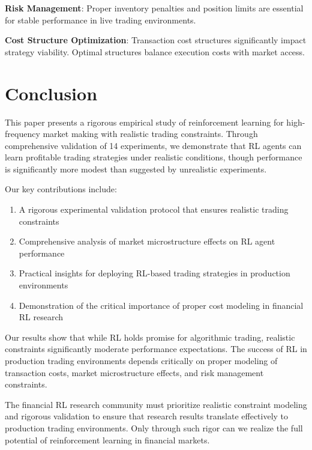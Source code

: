 \documentclass[11pt,a4paper]{article}
\begin{document}
\textbf{Risk Management}: Proper inventory penalties and position limits are essential for stable performance in live trading environments.

\textbf{Cost Structure Optimization}: Transaction cost structures significantly impact strategy viability. Optimal structures balance execution costs with market access.

\section{Conclusion}
\label{sec:conclusion}

This paper presents a rigorous empirical study of reinforcement learning for high-frequency market making with realistic trading constraints. Through comprehensive validation of 14 experiments, we demonstrate that RL agents can learn profitable trading strategies under realistic conditions, though performance is significantly more modest than suggested by unrealistic experiments.

Our key contributions include:

\begin{enumerate}
\item A rigorous experimental validation protocol that ensures realistic trading constraints
\item Comprehensive analysis of market microstructure effects on RL agent performance
\item Practical insights for deploying RL-based trading strategies in production environments
\item Demonstration of the critical importance of proper cost modeling in financial RL research
\end{enumerate}

Our results show that while RL holds promise for algorithmic trading, realistic constraints significantly moderate performance expectations. The success of RL in production trading environments depends critically on proper modeling of transaction costs, market microstructure effects, and risk management constraints.

The financial RL research community must prioritize realistic constraint modeling and rigorous validation to ensure that research results translate effectively to production trading environments. Only through such rigor can we realize the full potential of reinforcement learning in financial markets.
\end{document}
